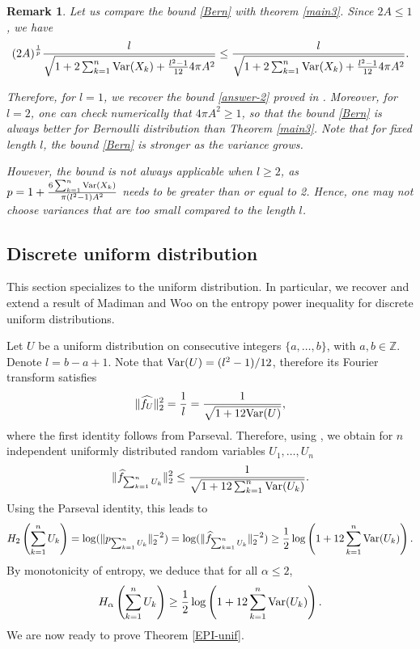 \documentclass[11pt]{article}
\newtheorem{remark}[thm]{Remark}
\DeclareMathOperator{\Var}{Var}
\newcommand{\1}{[1]}
\newcommand{\Z}{\mathbb{Z}}
\def\Var{{\rm Var}}
\begin{document}
\begin{remark}
    
Let us compare the bound \eqref{Bern} with theorem \ref{main3}. Since $2A \leq 1$, we have 
$$ (2A)^{\frac{1}{p}} \frac{l}{\sqrt{1 + 2 \sum_{k=1}^n \Var(X_k) + \frac{l^2-1}{12} 4 \pi A^2} } \leq \frac{l}{\sqrt{1 + 2 \sum_{k=1}^n \Var(X_k) + \frac{l^2-1}{12} 4 \pi A^2} }. $$

Therefore, for $l=1$, we recover the bound \eqref{answer-2} proved in \cite{MMR}. Moreover, for $l = 2$, one can check numerically that $4 \pi A^2 \geq 1$, so that the bound \eqref{Bern} is always better for Bernoulli distribution than Theorem \ref{main3}. Note that for fixed length $l$, the bound \eqref{Bern} is stronger as the variance grows.

However, the bound is not always applicable when $l \geq 2$, as $p = 1 + \frac{6 \sum_{k=1}^n \Var(X_k)}{\pi (l^2-1) A^2}$ needs to be greater than or equal to 2. Hence, one may not choose variances that are too small compared to the length $l$.

\end{remark}





\subsection{Discrete uniform distribution}

This section specializes to the uniform distribution. In particular, we recover and extend a result of Madiman and Woo \cite{MW} on the entropy power inequality for discrete uniform distributions.

Let $U$ be a uniform distribution on consecutive integers $\{a, \dots, b\}$, with $a,b \in \Z$. Denote $l = b-a+1$. Note that $\Var(U) = (l^2-1)/12$, therefore its Fourier transform satisfies
$$ \|\widehat{f_U}\|_2^2 = \frac{1}{l} = \frac{1}{\sqrt{1 + 12 \Var(U)}}, $$
where the first identity follows from Parseval. Therefore, using \cite[Lemma 2.7]{MMR}, we obtain for $n$ independent uniformly distributed random variables $U_1, \dots, U_n$
$$ \|\widehat{f}_{\sum_{k=1}^n U_k}\|_2^2 \leq \frac{1}{\sqrt{1 + 12 \sum_{k=1}^n \Var(U_k)}}. $$
Using the Parseval identity, this leads to
\begin{equation*}
H_2 \left( \sum_{k=1}^n U_k \right) = \log(\|p_{\sum_{k=1}^n U_k}\|_2^{-2}) = \log(\|\widehat{f}_{\sum_{k=1}^n U_k} \|_2^{-2}) \geq \frac{1}{2} \log \left( 1 + 12 \sum_{k=1}^n \Var(U_k) \right).
\end{equation*}
By monotonicity of entropy, we deduce that for all $\alpha \leq 2$,
\begin{equation}\label{unif}
H_{\alpha} \left( \sum_{k=1}^n U_k \right) \geq \frac{1}{2} \log \left( 1 + 12 \sum_{k=1}^n \Var(U_k) \right).
\end{equation}
We are now ready to prove Theorem \ref{EPI-unif}.
\end{document}
